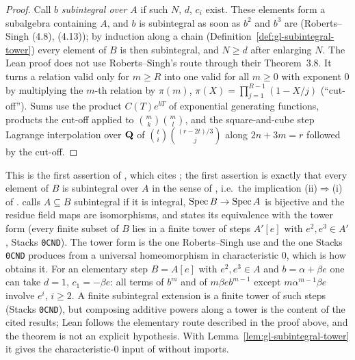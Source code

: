 \begin{proof}
Call $b$ \emph{subintegral over $A$} if such $N$, $d$, $c_i$ exist. These elements form a subalgebra containing $A$, and $b$ is subintegral as soon as
$b^2$ and $b^3$ are (Roberts--Singh (4.8), (4.13)); by induction along a chain (Definition~\ref{def:gl-subintegral-tower}) every element of $B$ is then
subintegral, and $N\ge d$ after enlarging $N$. The Lean proof does not use Roberts--Singh's route through their Theorem~3.8. It turns a relation valid
only for $m\ge R$ into one valid for all $m\ge0$ with exponent $0$ by multiplying the $m$-th relation by $\pi(m)$, $\pi(X)=\prod_{j=1}^{R-1}(1-X/j)$
(``cut-off''). Sums use the product $C(T)e^{bT}$ of exponential generating functions, products the cut-off applied to $\binom mk\binom ml$, and the
square-and-cube step Lagrange interpolation over $\mathbf{Q}$ of $\binom ti\binom{(r-2t)/3}j$ along $2n+3m=r$ followed by the cut-off.
\end{proof}

\begin{remark}\label{rmk:gl-additive-powers}
This is the first assertion of \cite[Lemma~8.2]{FHX}, which cites \cite[Theorem~4.17, Proposition~4.2, Corollary~4.3]{RobertsSingh} ; the first assertion is exactly that every
element of $B$ is subintegral over $A$ in the sense of \cite[p.~258]{RobertsSingh}, i.e.\ the implication (ii)$\Rightarrow$(i) of
\cite[Theorem~4.17]{RobertsSingh}. \cite[\S8]{FHX} calls
$A\subseteq B$ subintegral if it is integral, $\operatorname{Spec} B\to\operatorname{Spec} A$ is bijective and the residue field maps are isomorphisms, and states its equivalence
with the tower form (every finite subset of $B$ lies in a finite tower of steps $A'[e]$ with $e^2,e^3\in A'$, Stacks \texttt{0CND}). The tower form is the one Roberts--Singh use and the one Stacks \texttt{0CND} produces from a universal
homeomorphism in characteristic $0$, which is how \cite[Theorem~8.3]{FHX} obtains it. For an elementary step
$B=A[e]$ with $e^2,e^3\in A$ and $b=\alpha+\beta e$ one can take $d=1$, $c_1=-\beta e$: all terms of $b^m$ and of $m\beta eb^{m-1}$ except $m\alpha^{m-1}\beta e$ involve $e^i$,
$i\ge2$. A finite subintegral extension is a finite tower of such steps (Stacks \texttt{0CND}), but composing additive powers along a tower is the content of the cited
results; Lean follows the elementary route described in the proof above, and the theorem is not an explicit hypothesis. With Lemma~\ref{lem:gl-subintegral-tower} it gives the characteristic-$0$ input of \cite[Theorem~8.3]{FHX}
without imports.
\end{remark}

